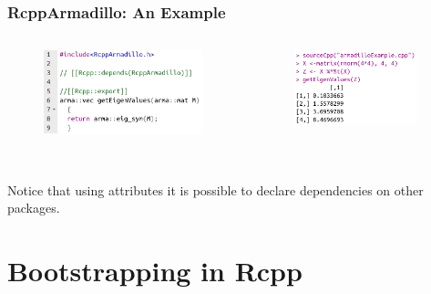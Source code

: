 \documentclass{beamer}
\begin{document}
\begin{frame}
\frametitle{RcppArmadillo: An Example}
\begin{columns}
\begin{figure}[htb]
    \centering
    \includegraphics[width=1.1\textwidth]{armadillo_1.png}
\end{figure} \pause
{}
\begin{figure}[htb]
    \centering
    \includegraphics[width=0.9\textwidth]{armadillo_2.png}
\end{figure} \pause
\end{columns}
\\
\vspace{5mm}
Notice that using attributes it is possible to declare dependencies on other packages.

\end{frame}


\section{Bootstrapping in Rcpp}
\end{document}
